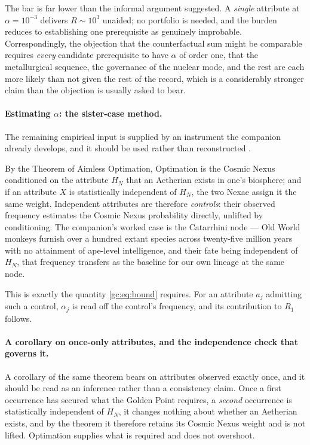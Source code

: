 \noindent The bar is far lower than the informal argument suggested. A
\emph{single} attribute at $\alpha=10^{-3}$ delivers $R\sim10^{3}$
unaided; no portfolio is needed, and the burden reduces to establishing
one prerequisite as genuinely improbable. Correspondingly, the objection
that the counterfactual sum might be comparable requires \emph{every}
candidate prerequisite to have $\alpha$ of order one, that the
metallurgical sequence, the governance of the nuclear mode, and the rest are each more likely
than not given the rest of the record, which is a considerably
stronger claim than the objection is usually asked to bear.

\paragraph{Estimating $\alpha$: the sister-case method.} The remaining
empirical input is supplied by an instrument the companion already
develops, and it should be used rather than reconstructed
\cite{Nexus}.

By the Theorem of Aimless Optimation, Optimation is the Cosmic Nexus
conditioned on the attribute $H_N$ that an Aetherian exists in one's
biosphere; and if an attribute $X$ is statistically independent of
$H_N$, the two Nexae assign it the same weight. Independent attributes
are therefore \emph{controls}: their observed frequency estimates the
Cosmic Nexus probability directly, unlifted by conditioning. The
companion's worked case is the Catarrhini node --- Old World monkeys
furnish over a hundred extant species across twenty-five million years
with no attainment of ape-level intelligence, and their fate being
independent of $H_N$, that frequency transfers as the baseline for our
own lineage at the same node.

This is exactly the quantity \eqref{gc:eq:bound} requires. For an
attribute $a_j$ admitting such a control, $\alpha_j$ is read off the
control's frequency, and its contribution to $R_1$ follows.

\paragraph{A corollary on once-only attributes, and the independence
check that governs it.}\label{gc:rem:onceonly}
A corollary of the same theorem bears on attributes observed exactly
once, and it should be read as an inference rather than a
consistency claim. Once a first occurrence has secured what the Golden
Point requires, a \emph{second} occurrence is statistically independent
of $H_N$, it changes nothing about whether an Aetherian exists, and by the theorem it therefore retains its Cosmic Nexus weight and is
not lifted. Optimation supplies what is required and does not
overshoot.

